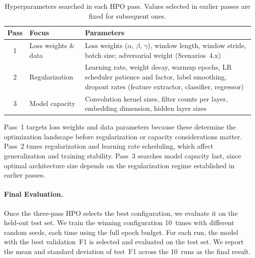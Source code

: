 \begin{table}[!t]
\centering
\caption{Hyperparameters searched in each HPO pass. Values selected in earlier passes are fixed for subsequent ones.}
\label{tab:hpo-passes}
\begin{tabular}{clp{7cm}}
\hline
\textbf{Pass} & \textbf{Focus} & \textbf{Parameters} \\
\hline
1 & Loss weights \& data & Loss weights ($\alpha$, $\beta$, $\gamma$), window length, window stride, batch size; adversarial weight (Scenarios~4.x) \\
2 & Regularization & Learning rate, weight decay, warmup epochs, LR scheduler patience and factor, label smoothing, dropout rates (feature extractor, classifier, regressor) \\
3 & Model capacity & Convolution kernel sizes, filter counts per layer, embedding dimension, hidden layer sizes \\
\hline
\end{tabular}
\end{table}

Pass~1 targets loss weights and data parameters because these determine the optimization landscape before regularization or capacity considerations matter. Pass~2 tunes regularization and learning rate scheduling, which affect generalization and training stability. Pass~3 searches model capacity last, since optimal architecture size depends on the regularization regime established in earlier passes.

\paragraph{Final Evaluation.}
Once the three-pass HPO selects the best configuration, we evaluate it on the held-out test set. We train the winning configuration 10~times with different random seeds, each time using the full epoch budget. For each run, the model with the best validation~F1 is selected and evaluated on the test set. We report the mean and standard deviation of test~F1 across the 10~runs as the final result.
